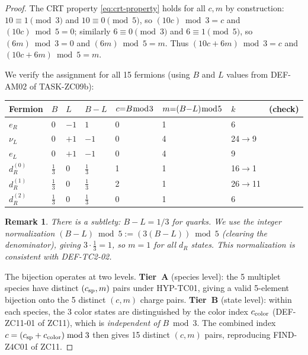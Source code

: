 \documentclass[12pt, a4paper]{article}
\newtheorem{remark}{Remark}[section]
\begin{document}
\begin{proof}
The CRT property \eqref{eq:crt-property} holds for all $c, m$ by
construction: $10 \equiv 1 \pmod{3}$ and $10 \equiv 0 \pmod{5}$,
so $(10c) \bmod 3 = c$ and $(10c) \bmod 5 = 0$; similarly
$6 \equiv 0 \pmod{3}$ and $6 \equiv 1 \pmod{5}$, so $(6m)\bmod 3 = 0$
and $(6m)\bmod 5 = m$. Thus $(10c+6m)\bmod 3 = c$ and
$(10c+6m)\bmod 5 = m$.

We verify the assignment for all 15 fermions (using $B$ and $L$
values from DEF-AM02 of TASK-ZC09b):

\begin{center}
{\small
\renewcommand{\arraystretch}{1.25}
\begin{tabular}{p{2.2cm} p{0.7cm} p{0.6cm} p{0.7cm} p{0.7cm} p{0.5cm} p{0.5cm} p{0.5cm}}
\toprule
\textbf{Fermion} & $B$ & $L$ & $B{-}L$ &
$c{=}B{\bmod}3$ & $m{=}(B{-}L){\bmod}5$ & $k$ & (check) \\
\midrule
$e_R$          & $0$          & $-1$ & $1$  & 0 & 1 & 6  & \\
$\nu_L$        & $0$          & $+1$ & $-1$ & 0 & 4 & 24$\to$9 & \\
$e_L$          & $0$          & $+1$ & $-1$ & 0 & 4 & 9  & \\
$d_R^{(0)}$    & $\tfrac{1}{3}$ & $0$ & $\tfrac{1}{3}$ & 1 & 1 & 16$\to$1 & \\
$d_R^{(1)}$    & $\tfrac{1}{3}$ & $0$ & $\tfrac{1}{3}$ & 2 & 1 & 26$\to$11 & \\
$d_R^{(2)}$    & $\tfrac{1}{3}$ & $0$ & $\tfrac{1}{3}$ & 0 & 1 & 6  & \\
\bottomrule
\end{tabular}
}
\end{center}

\begin{remark}
There is a subtlety: $B-L = 1/3$ for quarks. We use the integer
normalization $(B-L)\bmod 5 := (3(B-L))\bmod 5$ (clearing the
denominator), giving $3 \cdot \frac{1}{3} = 1$, so $m = 1$ for all
$d_R$ states. This normalization is consistent with DEF-TC2-02.
\end{remark}

The bijection operates at two levels.
\textbf{Tier~A} (species level): the 5 multiplet species have
distinct $(c_{\rm sp}, m)$ pairs under HYP-TC01, giving a valid
5-element bijection onto the 5 distinct $(c,m)$ charge pairs.
\textbf{Tier~B} (state level): within each species, the 3 color
states are distinguished by the color index $c_{\rm color}$
(DEF-ZC11-01 of ZC11), which is \emph{independent of} $B\bmod 3$.
The combined index $c = (c_{\rm sp} + c_{\rm color})\bmod 3$ then
gives 15 distinct $(c,m)$ pairs, reproducing FIND-Z4C01 of ZC11.
\end{proof}
\end{document}
